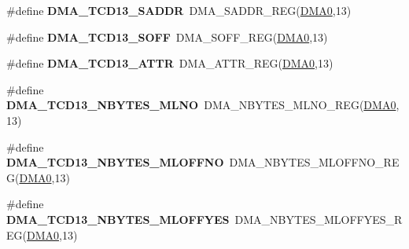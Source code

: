 \begin{DoxyCompactItemize}
\item 
\#define {\bfseries D\+M\+A\+\_\+\+T\+C\+D13\+\_\+\+S\+A\+D\+DR}~D\+M\+A\+\_\+\+S\+A\+D\+D\+R\+\_\+\+R\+EG(\hyperlink{group__DMA__Peripheral__Access__Layer_ga4103044f9ca209772f513dc694513ffb}{D\+M\+A0},13)\hypertarget{group__DMA__Register__Accessor__Macros_ga5daa84539093d0893fdc44fe66a428b6}{}\label{group__DMA__Register__Accessor__Macros_ga5daa84539093d0893fdc44fe66a428b6}

\item 
\#define {\bfseries D\+M\+A\+\_\+\+T\+C\+D13\+\_\+\+S\+O\+FF}~D\+M\+A\+\_\+\+S\+O\+F\+F\+\_\+\+R\+EG(\hyperlink{group__DMA__Peripheral__Access__Layer_ga4103044f9ca209772f513dc694513ffb}{D\+M\+A0},13)\hypertarget{group__DMA__Register__Accessor__Macros_ga16316fcc7464927e4acc256cc841b340}{}\label{group__DMA__Register__Accessor__Macros_ga16316fcc7464927e4acc256cc841b340}

\item 
\#define {\bfseries D\+M\+A\+\_\+\+T\+C\+D13\+\_\+\+A\+T\+TR}~D\+M\+A\+\_\+\+A\+T\+T\+R\+\_\+\+R\+EG(\hyperlink{group__DMA__Peripheral__Access__Layer_ga4103044f9ca209772f513dc694513ffb}{D\+M\+A0},13)\hypertarget{group__DMA__Register__Accessor__Macros_ga28f938b232c24344f2cc299689aeb089}{}\label{group__DMA__Register__Accessor__Macros_ga28f938b232c24344f2cc299689aeb089}

\item 
\#define {\bfseries D\+M\+A\+\_\+\+T\+C\+D13\+\_\+\+N\+B\+Y\+T\+E\+S\+\_\+\+M\+L\+NO}~D\+M\+A\+\_\+\+N\+B\+Y\+T\+E\+S\+\_\+\+M\+L\+N\+O\+\_\+\+R\+EG(\hyperlink{group__DMA__Peripheral__Access__Layer_ga4103044f9ca209772f513dc694513ffb}{D\+M\+A0},13)\hypertarget{group__DMA__Register__Accessor__Macros_gaab87071d26a96462642ee41f335a33b6}{}\label{group__DMA__Register__Accessor__Macros_gaab87071d26a96462642ee41f335a33b6}

\item 
\#define {\bfseries D\+M\+A\+\_\+\+T\+C\+D13\+\_\+\+N\+B\+Y\+T\+E\+S\+\_\+\+M\+L\+O\+F\+F\+NO}~D\+M\+A\+\_\+\+N\+B\+Y\+T\+E\+S\+\_\+\+M\+L\+O\+F\+F\+N\+O\+\_\+\+R\+EG(\hyperlink{group__DMA__Peripheral__Access__Layer_ga4103044f9ca209772f513dc694513ffb}{D\+M\+A0},13)\hypertarget{group__DMA__Register__Accessor__Macros_ga993e012974c139fa90448d13ffab5eb7}{}\label{group__DMA__Register__Accessor__Macros_ga993e012974c139fa90448d13ffab5eb7}

\item 
\#define {\bfseries D\+M\+A\+\_\+\+T\+C\+D13\+\_\+\+N\+B\+Y\+T\+E\+S\+\_\+\+M\+L\+O\+F\+F\+Y\+ES}~D\+M\+A\+\_\+\+N\+B\+Y\+T\+E\+S\+\_\+\+M\+L\+O\+F\+F\+Y\+E\+S\+\_\+\+R\+EG(\hyperlink{group__DMA__Peripheral__Access__Layer_ga4103044f9ca209772f513dc694513ffb}{D\+M\+A0},13)\hypertarget{group__DMA__Register__Accessor__Macros_ga1389c6de1ab258aa1fde43bc72b591f0}{}\label{group__DMA__Register__Accessor__Macros_ga1389c6de1ab258aa1fde43bc72b591f0}


\end{DoxyCompactItemize}
